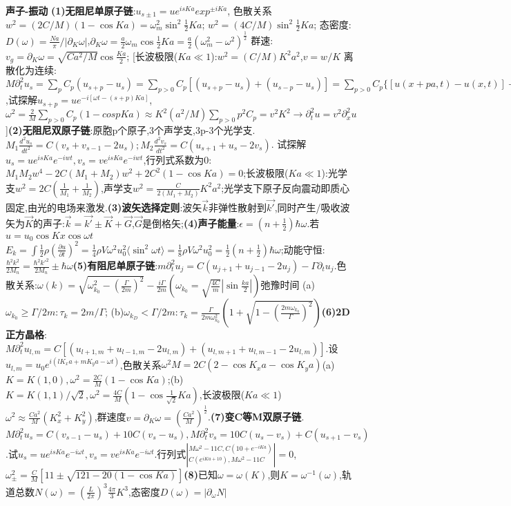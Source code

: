\documentclass[UTF8,a4paper,10pt,twocolumn]{ctexart}
\begin{document}
  \textbf{声子-振动}
  \textbf{(1)无阻尼单原子链}:$u_{s\pm 1}=ue^{isKa}exp^{\pm iKa}$,
  色散关系$w^2=(2C/M)(1-\cos{Ka})=\omega_m^2\sin^2{\frac{1}{2}Ka}$;
  $w^2=(4C/M)\sin^2{\frac{1}{2}Ka}$;
  态密度:$D(\omega)=\frac{Na}{\pi}/|\partial_K\omega|$,$\partial_K\omega=\frac{a}{2}\omega_m\cos{\frac{1}{2}Ka}=\frac{a}{2}(\omega_m^2-\omega^2)^{\frac{1}{2}}$
  群速:$v_{g}=\partial_{K}\omega=\sqrt{Ca^2/M}\cos{\frac{Ka}{2}}$;
  [长波极限($Ka\ll 1$):$w^2=(C/M)K^{2}a^{2}$,$v=w/K$
  离散化为连续:$M\partial_t^2u_s=\sum_pC_p(u_{s+p}-u_s)=\sum_{p>0}C_{p}[(u_{s+p}-u_s)+(u_{s-p}-u_s)]=\sum_{p>0}C_p\{[u(x+pa,t)-u(x,t)]+[u(x-pa,t)-u(x,t)]\}=\sum_{p>0}C_pp^2a^2\partial_x^2u(x,t)$,试探解$u_{s+p}=ue^{-i[\omega t-(s+p)Ka]}$,
  $\omega^2=\frac{2}{M}\sum_{p>0}C_p(1-cos{pKa})\approx K^2(a^2/M)\sum_{p>0}p^2C_p=v^2K^2\rightarrow\partial_t^2u=v^2\partial_x^2u$]\textbf{(2)无阻尼双原子链}:原胞p个原子,3个声学支,3p-3个光学支.$M_1\frac{d^2 u_s}{dt^2}=C(v_s+v_{s-1}-2u_s);M_2\frac{d^2 v_s}{dt^2}=C(u_{s+1}+u_{s}-2v_s)$.
  试探解$u_s=ue^{isKa}e^{-iwt},v_s=ve^{isKa}e^{-iwt}$,行列式系数为0:$M_1 M_2 w^4-2C(M_1+M_2)w^2+2C^2(1-\cos{Ka})=0$;长波极限($Ka\ll 1$):光学支$w^2=2C(\frac{1}{M_1}+\frac{1}{M_2})$,声学支$w^2=\frac{C}{2(M_1+M_2)}K^2 a^2$;光学支下原子反向震动即质心固定,由光的电场来激发.\textbf{(3)波矢选择定则}:波矢$\vec{k}$非弹性散射到$\vec{k'}$,同时产生/吸收波矢为$\vec{K}$的声子:$\vec{k}=\vec{k'}\pm\vec{K}+\vec{G}$,$\vec{G}$是倒格矢;\textbf{(4)声子能量}:$\epsilon=(n+\frac{1}{2})\hbar\omega$.若$u=u_0\cos{Kx}\cos{\omega t}$$E_k=\int\frac{1}{2}\rho(\frac{\partial u}{\partial t})^2=\frac{1}{4}\rho V\omega^2u_0^2\langle\sin^2{\omega t}\rangle=\frac{1}{8}\rho V\omega^2u_0^2=\frac{1}{2}(n+\frac{1}{2})\hbar\omega$;动能守恒:$\frac{\hbar^2 k^2}{2M_n}=\frac{\hbar^2 k'^2}{2M_n}\pm\hbar\omega$\textbf{(5)有阻尼单原子链}:$m\partial_t^2u_j=C(u_{j+1}+u_{j-1}-2u_j)-\Gamma\partial_tu_j$.色散关系:$\omega(k)=\sqrt{\omega_{k_0}^2-(\frac{\Gamma}{2m})^2}-\frac{i\Gamma}{2m}(\omega_{k_0}=\sqrt{\frac{4C}{m}}|\sin{\frac{ka}{2}}|)$弛豫时间
  (a)$\omega_{k_0}\geq\Gamma/2m:\tau_k=2m/\Gamma$;
  (b)$\omega_{k_D}<\Gamma/2m:\tau_k=\frac{\Gamma}{2m\omega_{k_0}^2}(1+\sqrt{1-(\frac{2m\omega_{k_0}}{\Gamma})^2})$\textbf{(6)2D正方晶格}:$M\partial_{t}^2{u_{l,m}}=C[(u_{l+1,m}+u_{l-1,m}-2u_{l,m})+(u_{l,m+1}+u_{l,m-1}-2u_{l,m})]$.设$u_{l,m}=u_0e^{i(lK_xa+mK_ya-\omega t)}$,色散关系$\omega^2 M=2C(2-\cos{K_{x}a}-\cos{K_{y}a})$(a)$K=K(1,0),\omega^2=\frac{2C}{M}(1-\cos{Ka})$;(b)$K=K(1,1)/\sqrt{2},\omega^2=\frac{4C}{M}(1-\cos{\frac{1}{\sqrt{2}}Ka})$,长波极限($Ka\ll 1$)$\omega^2\approx\frac{Ca^2}{M}(K_x^2+K_y^2)$,群速度$v=\partial_{K}\omega=(\frac{Ca^2}{M})^{\frac{1}{2}}$.\textbf{(7)变C等M双原子链}.$M\partial_t^2u_s=C(v_{s-1}-u_s)+10C(v_s-u_s),M\partial_t^2v_s=10C(u_s-v_s)+C(u_{s+1}-v_s)$.试$u_s=ue^{isKa}e^{-i\omega t},v_s=ve^{isKa}e^{-i\omega t}$.行列式$|^{M\omega^2-11C,C(10+e^{-iKa})}_{C(e^{iKa+10}),M\omega^2-11C}|=0$,$\omega_{\pm}^2=\frac{C}{M}[11\pm\sqrt{121-20(1-\cos{Ka})}]$\textbf{(8)}已知$\omega=\omega(K)$,则$K=\omega^{-1}(\omega)$,轨道总数$N(\omega)=(\frac{L}{2\pi})^3\frac{4\pi}{3}K^3$,态密度$D(\omega)=|\partial_\omega N|$
\end{document}
